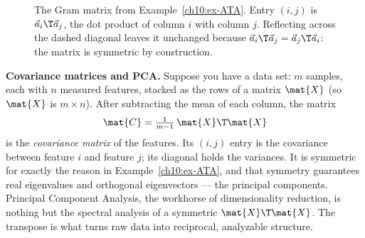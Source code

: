 \begin{figure}[H]
\centering
{}
\caption{The Gram matrix from Example~\ref{ch10:ex-ATA}. Entry $(i,j)$ is $\vec{a}_i\T\vec{a}_j$, the
dot product of column $i$ with column $j$. Reflecting across the dashed diagonal leaves it unchanged
because $\vec{a}_i\T\vec{a}_j=\vec{a}_j\T\vec{a}_i$: the matrix is symmetric by construction.}
\label{ch10:fig-gram}
\end{figure}

\begin{applicationbox}
\textbf{Covariance matrices and PCA.} Suppose you have a data set: $m$ samples, each with $n$
measured features, stacked as the rows of a matrix $\mat{X}$ (so $\mat{X}$ is $m\times n$). After
subtracting the mean of each column, the matrix
\[
  \mat{C} = \tfrac{1}{m-1}\,\mat{X}\T\mat{X}
\]
is the \emph{covariance matrix} of the features. Its $(i,j)$ entry is the covariance between feature
$i$ and feature $j$; its diagonal holds the variances. It is symmetric for exactly the reason in
Example~\ref{ch10:ex-ATA}, and that symmetry guarantees real eigenvalues and orthogonal eigenvectors
--- the principal components. Principal Component Analysis, the workhorse of dimensionality
reduction, is nothing but the spectral analysis of a symmetric $\mat{X}\T\mat{X}$. The transpose is
what turns raw data into reciprocal, analyzable structure.
\end{applicationbox}

